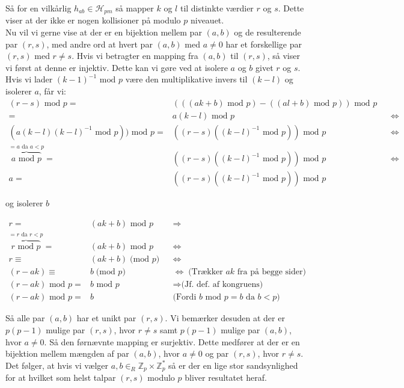 \documentclass[12pt]{article}
\newcommand{\Z}{\mathbb{Z}}
\begin{document}
Så for en vilkårlig $h_{ab} \in \mathcal{H}_{pm}$ så mapper $k$ og $l$ til distinkte værdier $r$ og $s$. Dette viser at der ikke er nogen kollisioner på modulo $p$ niveauet. \\

Nu vil vi gerne vise at der er en bijektion mellem par $(a,b)$ og de resulterende par $(r,s)$, med andre ord at hvert par $(a,b)$ med $a \ne 0$ har et forskellige par $(r,s)$ med $r \ne s$. Hvis vi betragter en mapping fra $(a,b)$ til $(r,s)$, så viser vi først at denne er injektiv. Dette kan vi gøre ved at isolere $a$ og $b$ givet $r$ og $s$. Hvis vi lader $(k-1)^{-1} \text{ mod } p$ være den multiplikative invers til $(k-l)$ og isolerer $a$, får vi: \\

\begin{align*}
    (r-s) \text{ mod } p =& (((ak+b) \text{ mod } p)-((al+b) \text{ mod } p)) \text{ mod } p \\
    =& a(k-l) \text{ mod } p && \Leftrightarrow \\
    (a(k-l)(k-l)^{-1} \text{ mod } p)) \text{ mod } p =& ((r-s)((k-l)^{-1} \text{ mod } p)) \text{ mod } p && \Leftrightarrow \\
    \overbrace{a \text{ mod } p}^{= a \text{ da } a<p} =& ((r-s)((k-l)^{-1} \text{ mod } p)) \text{ mod } p && \Leftrightarrow \\
    a =& ((r-s)((k-l)^{-1} \text{ mod } p)) \text{ mod } p
\end{align*}

og isolerer $b$

\begin{align*}
    r =& (ak+b) \text{ mod } p && \Rightarrow \\
    \overbrace{r \text{ mod } p}^{=r \text{ da } r<p} =& (ak+b) \text{ mod } p  && \Leftrightarrow \\
    r \equiv& (ak+b) \; \text{(mod } p) && \Leftrightarrow\\
    (r-ak) \equiv& b \; \text{(mod }p)   && \Leftrightarrow \; \text{(Trækker } ak \text{ fra på begge sider)} \\
    (r-ak) \text{ mod } p =& b \text{ mod } p && \Rightarrow \text{(Jf. def. af kongruens)} \\
    (r-ak) \text{ mod } p =& b && \text{(Fordi } b \text{ mod } p=b \text{ da } b<p)
\end{align*}

Så alle par $(a,b)$ har et unikt par $(r,s)$. Vi bemærker desuden at der er $p(p-1)$ mulige par $(r,s)$, hvor $r \ne s$ samt $p(p-1)$ mulige par $(a,b)$, hvor $a \ne 0$. Så den førnævnte mapping er surjektiv. Dette medfører at der er en bijektion mellem mængden af par $(a,b)$, hvor $a \ne 0$ og par $(r,s)$, hvor $r \ne s$. Det følger, at hvis vi vælger $a,b \in_R \Z_p \times \Z_p^*$ så er der en lige stor sandsynlighed for at hvilket som helst talpar $(r,s)$ modulo $p$ bliver  resultatet heraf. \\
\end{document}
